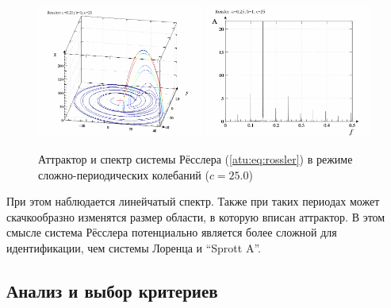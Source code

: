 \begin{figure}[ht!]
\begin{center}
  \includegraphics[width=0.49\textwidth]{p/cha/ross/ross0-p_xyz_c=25x00.png}
  \hfill
  \includegraphics[width=0.49\textwidth]{p/cha/ross/ross_f-p_f_c=25x00.png}
\end{center}
  \caption{Аттрактор и спектр системы Рёсслера (\ref{atu:eq:rossler}) в режиме сложно-периодических колебаний ($c=25.0$)}
\label{atu:f:ross_attractor_2500}
\end{figure}

При этом наблюдается линейчатый спектр. Также при
таких периодах может скачкообразно изменятся
размер области, в которую вписан аттрактор.
В этом смысле система Рёсслера потенциально является более сложной
для идентификации, чем системы Лоренца и ``Sprott A''.

%



\subsection{Анализ и выбор критериев}  %

